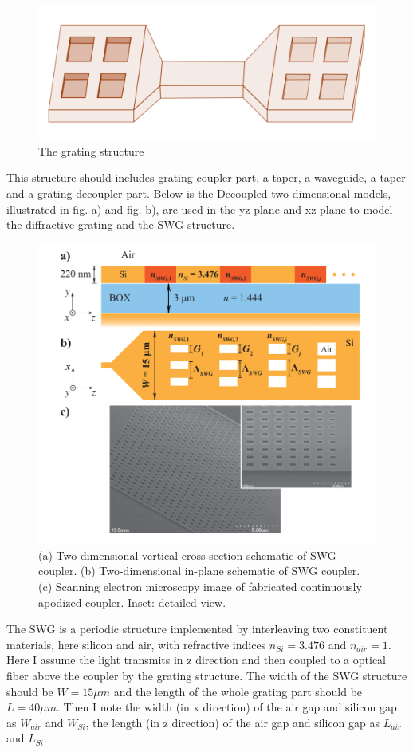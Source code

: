 \documentclass[]{article}
\begin{document}
\begin{figure}[H]
	\centering
	\includegraphics[width=0.7\linewidth]{figures/figure12.png}
	\caption{The grating structure}
	\label{fig:figure11}
\end{figure}

This structure should includes grating coupler part, a taper, a waveguide, a taper and a grating decoupler part. Below is the Decoupled two-dimensional models, illustrated in fig. a) and fig. b), are used in the yz-plane and xz-plane to model the diffractive grating and the SWG structure.

\begin{figure}[H]
	\centering
	\includegraphics[width=0.7\linewidth]{figures/figure11.png}
	\caption{(a) Two-dimensional vertical cross-section schematic of SWG coupler. (b) Two-dimensional in-plane schematic of SWG coupler. (c) Scanning electron microscopy image of fabricated continuously apodized coupler. Inset: detailed view.}
	\label{fig:figure11}
\end{figure}

The SWG is a periodic structure implemented by interleaving two constituent materials, here silicon and air, with refractive indices $n_{Si} = 3.476$ and $n_{air} = 1$. Here I assume the light transmits in z direction and then coupled to a optical fiber above the coupler by the grating structure. The width of the SWG structure should be $W = 15 \mu m$ and the length of the whole grating part should be $L = 40 \mu m$. Then I note the width (in x direction) of the air gap and silicon gap as $W_{air}$ and $W_{Si}$, the length (in z direction) of the air gap and silicon gap as $L_{air}$ and $L_{Si}$. 
\end{document}
